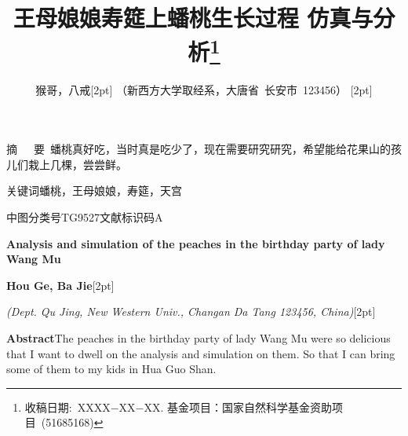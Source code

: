 \documentclass[a4paper,11pt,onecolumn,twoside]{article}
\title{\huge{王母娘娘寿筵上蟠桃生长过程
			仿真与分析}\thanks{收稿日期:~XXXX$-$XX$-$XX. 基金项目：国家自然科学基金资助项目~(51685168)}}
\author{猴哥，八戒[2pt]
		\normalsize
		（新西方大学取经系，大唐省~长安市~123456） [2pt]}
\date{}  %
\begin{document}
	
	\begin{CJK}{UTF8}{gbsn}
		
		\newcommand{\supercite}[1]{\textsuperscript{\cite{#1}}}
		\maketitle
		
		\setlength{\oddsidemargin}{ 1cm}  %
		\setlength{\evensidemargin}{\oddsidemargin}
		\setlength{\textwidth}{13.50cm}
		\vspace{-.8cm}
		\begin{center}
			\parbox{\textwidth}{
				摘~~~要\quad {}~蟠桃真好吃，当时真是吃少了，现在需要研究研究，希望能给花果山的孩儿们栽上几棵，尝尝鲜。
				
				关键词\quad{}蟠桃，王母娘娘，寿筵，天宫
				
				中图分类号\quad TG9527\qquad  {}文献标识码\quad A}
		\end{center}
		\vspace{.1cm}
		\begin{center}
			\parbox{\textwidth}{
				{\large{\textbf{Analysis and simulation of the peaches in the birthday party of lady Wang Mu}}}
				
				\vspace{-0.5cm}
				\begin{center}
					
					\textbf{Hou Ge, Ba Jie}[2pt]
					
					\small{\textit{(Dept. Qu Jing, New Western Univ., Changan Da Tang 123456, China)}}[2pt]
				\end{center}
				{\small{\textbf{Abstract}\quad The peaches in the birthday party of lady Wang Mu were so delicious that I want to dwell on the analysis and simulation on them. So that I can bring some of them to my kids in Hua Guo Shan.
						
}}}
\end{center}
\end{CJK}
\end{document}
